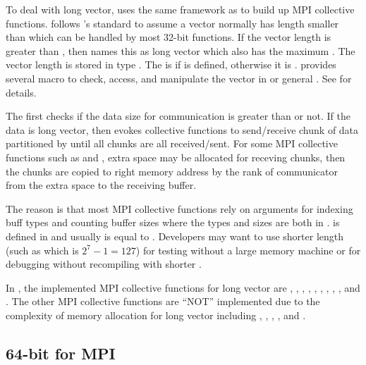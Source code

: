To deal with long vector,
 uses the same framework as  to build up MPI
collective functions.  follows 's standard to
assume a vector normally has length smaller than 
which can be handled by most 32-bit functions. If the vector length
is greater than , then  names this as
long vector which also has the maximum . The vector length
is stored in type . The  is  if
 is defined, otherwise it is .
 provides several  macro to check, access, and
manipulate the vector in  or general .
See  for details.

The  first checks if the data size for
communication is greater than  or not.
If the data is long vector, then  evokes collective functions
to send/receive chunk of data partitioned by  until
all chunks are all received/sent.
For some MPI collective functions such as
 and , extra space may be allocated
for receving chunks, then the chunks are copied to right memory address
by the rank of communicator from the extra space to the receiving buffer.

The reason is that most MPI collective functions rely on arguments
for indexing buff types and counting buffer sizes where the types and sizes
are both in .
 is defined in  and
usually is equal to . Developers may want to
use shorter length (such as  which is $2^7 - 1 = 127$)
for testing without a large memory machine or
for debugging without recompiling  with shorter
.

In ,
the implemented MPI collective functions for long vector are
, ,
, , , ,
, , , and .
The other MPI collective functions are
``NOT'' implemented due to the complexity of memory allocation for long vector
including , , ,
, and .


\subsection{64-bit for MPI}

